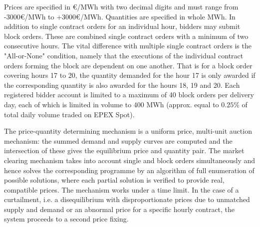 
Prices are specified in \euro{}/MWh with two decimal digits and must range from -3000\euro{}/MWh to +3000\euro{}/MWh. Quantities are specified in whole MWh. In addition to single contract orders for an individual hour, bidders may submit block orders. 
These are combined single contract orders with a minimum of two consecutive hours. The vital difference with multiple single contract orders is the "All-or-None" condition, namely that the executions of the individual contract orders forming the block are dependent on one another. That is for a block order covering hours 17 to 20, the quantity demanded for the hour 17 is only awarded if the corresponding quantity is also awarded for the hours 18, 19 and 20. Each registered bidder account is limited to a maximum of 40 block orders per delivery day, each of which is limited in volume to 400 MWh (approx. equal to $0.25\%$ of total daily volume traded on EPEX Spot). 

The price-quantity determining mechanism is a uniform price, multi-unit auction mechanism: the summed demand and supply curves are computed and the intersection of these gives the equilibrium price and quantity pair. The market clearing mechanism takes into account single and block orders simultaneously and hence solves the corresponding programme by an algorithm of full enumeration of possible solutions, where each partial solution is verified to provide real, compatible prices. %
The mechanism works under a time limit. In the case of a curtailment, i.e. a disequilibrium with disproportionate prices due to unmatched supply and demand or an abnormal price for a specific hourly contract, the system proceeds to a second price fixing. 

